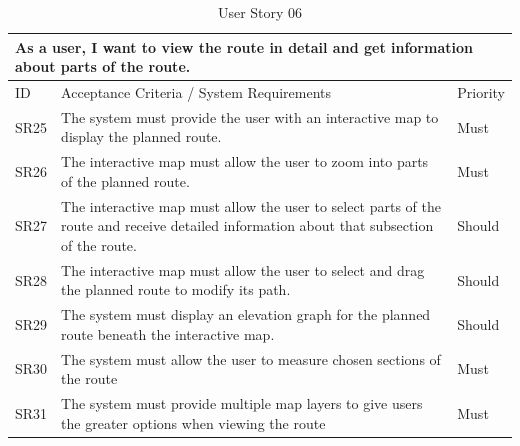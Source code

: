 \begin{table}[!htb]
  \caption{User Story 06}
  \label{tab:user-story-06}
  \begin{tabular}{ m{1cm} m{11cm} m{1cm} }
  \hline
  \multicolumn{3}{p{13cm}}{As a user, I want to view the route in detail and get information about parts of the route.}\\ 
  \hline
  ID & Acceptance Criteria / System Requirements & Priority\\
  \hline
  \label{SR:25}SR25 & The system must provide the user with an interactive map to display the planned route. & Must \\
  \label{SR:26}SR26 & The interactive map must allow the user to zoom into parts of the planned route. & Must\\
  \label{SR:27}SR27 & The interactive map must allow the user to select parts of the route and receive detailed information about that subsection of the route. & Should\\
  \label{SR:28}SR28 & The interactive map must allow the user to select and drag the planned route to modify its path. & Should\\ 
  \label{SR:29}SR29 & The system must display an elevation graph for the planned route beneath the interactive map. & Should\\
  \label{SR:30}SR30 & The system must allow the user to measure chosen sections of the route & Must\\
  \label{SR:31}SR31 & The system must provide multiple map layers to give users the greater options when viewing the route & Must\\ 
  \hline
  \end{tabular}
\end{table}

